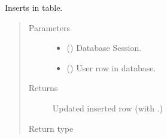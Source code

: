\documentclass[a4paper,landscape,10pt,english]{sphinxmanual}
\begin{document}
\begin{fulllineitems}
\label{\detokenize{code_docs/simulation_api.model:simulation_api.model.crud._create_user}}
Inserts  in  table.
\begin{quote}\begin{description}
\item[{Parameters}] \leavevmode\begin{itemize}
\item {} 
 () \textendash{} Database Session.

\item {} 
 ({\hyperref[\detokenize{code_docs/simulation_api.controller:simulation_api.controller.schemas.UserDBSchCreate}]{}}) \textendash{} User row in database.

\end{itemize}

\item[{Returns}] \leavevmode
{} \textendash{} Updated inserted row (with {\hyperref[\detokenize{code_docs/simulation_api.model:simulation_api.model.models.UserDB.user_id}]{}}.)

\item[{Return type}] \leavevmode
{\hyperref[\detokenize{code_docs/simulation_api.model:simulation_api.model.models.UserDB}]{}}

\end{description}\end{quote}

\end{fulllineitems}
\end{document}
